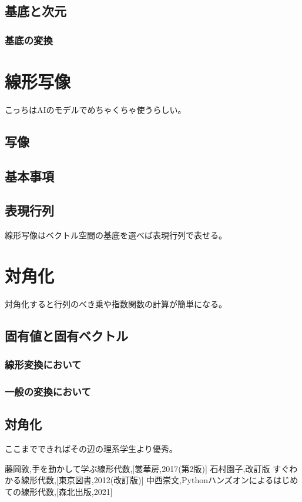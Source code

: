 \documentclass[10pt]{jsarticle}
\theoremstyle{definition}%
\numberwithin{equation}{section}%
\begin{document}
\subsection{基底と次元}
\subsubsection{基底の変換}
\section{線形写像}
こっちはAIのモデルでめちゃくちゃ使うらしい。
\subsection{写像}
\subsection{基本事項}
\subsection{表現行列}
線形写像はベクトル空間の基底を選べば表現行列で表せる。
\section{対角化}
対角化すると行列のべき乗や指数関数の計算が簡単になる。
\subsection{固有値と固有ベクトル}
\subsubsection{線形変換において}
\subsubsection{一般の変換において}
\subsection{対角化}
ここまでできればその辺の理系学生より優秀。
\begin{thebibliography}{99}
   藤岡敦,手を動かして学ぶ線形代数,[裳華房,2017(第2版)]
   石村園子,改訂版 すぐわかる線形代数,[東京図書,2012(改訂版)]
   中西崇文,Pythonハンズオンによるはじめての線形代数,[森北出版,2021]
\end{thebibliography}
\end{document}
